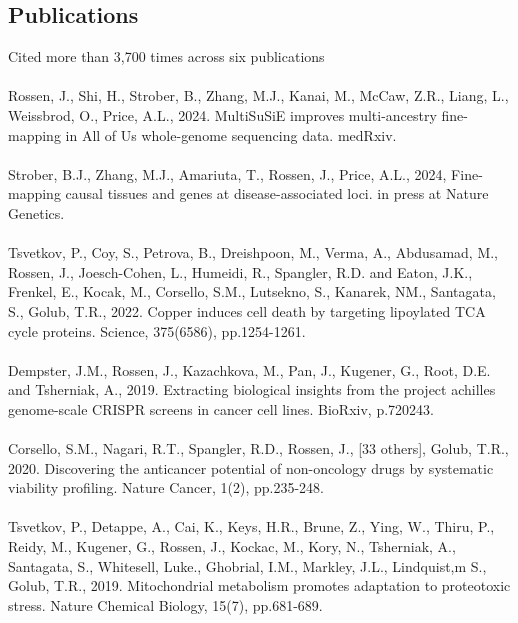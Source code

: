 \documentclass[margin,line]{res}
\begin{document}
\begin{resume}
\section{Publications} 
Cited more than 3,700 times across six publications
\\\\
Rossen, J., Shi, H., Strober, B., Zhang, M.J., Kanai, M., McCaw, Z.R., Liang, L., Weissbrod, O., Price, A.L., 2024. MultiSuSiE improves multi-ancestry fine-mapping in All of Us whole-genome sequencing data. medRxiv.\\\\
Strober, B.J., Zhang, M.J., Amariuta, T., Rossen, J., Price, A.L., 2024, Fine-mapping causal tissues and genes at disease-associated loci. in press at Nature Genetics.\\\\
Tsvetkov, P., Coy, S., Petrova, B., Dreishpoon, M., Verma, A., Abdusamad, M., Rossen, J., Joesch-Cohen, L., Humeidi, R., Spangler, R.D. and Eaton, J.K., Frenkel, E., Kocak, M., Corsello, S.M., Lutsekno, S., Kanarek, NM., Santagata, S., Golub, T.R., 2022. Copper induces cell death by targeting lipoylated TCA cycle proteins. Science, 375(6586), pp.1254-1261.\\\\
Dempster, J.M., Rossen, J., Kazachkova, M., Pan, J., Kugener, G., Root, D.E. and Tsherniak, A., 2019. Extracting biological insights from the project achilles genome-scale CRISPR screens in cancer cell lines. BioRxiv, p.720243.\\\\
Corsello, S.M., Nagari, R.T., Spangler, R.D., Rossen, J., [33 others], Golub, T.R., 2020. Discovering the anticancer potential of non-oncology drugs by systematic viability profiling. Nature Cancer, 1(2), pp.235-248.\\\\
Tsvetkov, P., Detappe, A., Cai, K., Keys, H.R., Brune, Z., Ying, W., Thiru, P., Reidy, M., Kugener, G., Rossen, J., Kockac, M., Kory, N., Tsherniak, A., Santagata, S., Whitesell, Luke., Ghobrial, I.M., Markley, J.L., Lindquist,m S., Golub, T.R., 2019. Mitochondrial metabolism promotes adaptation to proteotoxic stress. Nature Chemical Biology, 15(7), pp.681-689.
\end{resume}
\end{document}
